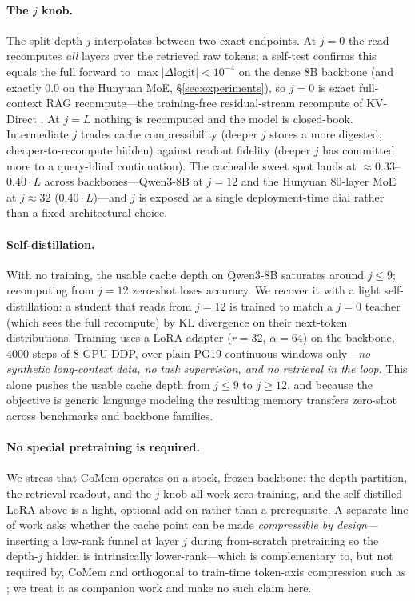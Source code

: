 \paragraph{The $j$ knob.} The split depth $j$ interpolates between two exact
endpoints. At $j{=}0$ the read recomputes \emph{all} layers over the retrieved
raw tokens; a self-test confirms this equals the full forward to
$\max|\Delta\text{logit}|<10^{-4}$ on the dense 8B backbone (and exactly
$0.0$ on the Hunyuan MoE, \S\ref{sec:experiments}), so $j{=}0$ is exact
full-context RAG recompute---the training-free residual-stream recompute of
KV-Direct \citep{kvdirect}. At $j{=}L$ nothing is recomputed and the model is
closed-book. Intermediate $j$ trades cache compressibility (deeper $j$ stores a
more digested, cheaper-to-recompute hidden) against readout fidelity (deeper $j$
has committed more to a query-blind continuation). The cacheable sweet spot
lands at $\approx 0.33$--$0.40\!\cdot\!L$ across backbones---Qwen3-8B at
$j{=}12$ and the Hunyuan 80-layer MoE at $j{\approx}32$
($0.40\!\cdot\!L$)---and $j$ is exposed as a single deployment-time dial rather
than a fixed architectural choice.

\paragraph{Self-distillation.} With no training, the usable cache depth on
Qwen3-8B saturates around $j{\le}9$; recomputing from $j{=}12$ zero-shot loses
accuracy. We recover it with a light self-distillation: a student that reads
from $j{=}12$ is trained to match a $j{=}0$ teacher (which sees the full
recompute) by KL divergence on their next-token distributions. Training uses a
LoRA adapter ($r{=}32$, $\alpha{=}64$) on the backbone, $4000$ steps of 8-GPU
DDP, over plain PG19 continuous windows only---\emph{no synthetic
long-context data, no task supervision, and no retrieval in the loop}. This
alone pushes the usable cache depth from $j{\le}9$ to $j{\ge}12$, and because
the objective is generic language modeling the resulting memory transfers
zero-shot across benchmarks and backbone families.

\paragraph{No special pretraining is required.} We stress that CoMem operates on
a stock, frozen backbone: the depth partition, the retrieval readout, and the
$j$ knob all work zero-training, and the self-distilled LoRA above is a light,
optional add-on rather than a prerequisite. A separate line of work asks whether
the cache point can be made \emph{compressible by design}---inserting a
low-rank funnel at layer $j$ during from-scratch pretraining so the depth-$j$
hidden is intrinsically lower-rank---which is complementary to, but not required
by, CoMem and orthogonal to train-time token-axis compression such as
\citet{kvcat}; we treat it as companion work and make no such claim here.
